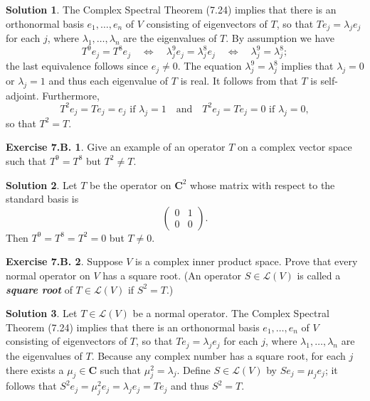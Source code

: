 \documentclass[12pt]{article}
\theoremstyle{definition}
\theoremstyle{exercise}
\newtheorem{exercise}{Exercise 7.B.}
\theoremstyle{solution}
\newtheorem*{solution}{Solution}
\newcommand{\lmap}{\mathcal{L}}
\newcommand{\quand}{\quad \text{and} \quad}
\newcommand{\quiff}{\quad \iff \quad}
\newcommand{\C}{\mathbf{C}}
\begin{document}
\begin{solution}
    The Complex Spectral Theorem (7.24) implies that there is an orthonormal basis \( e_1, \ldots, e_n \) of \( V \) consisting of eigenvectors of \( T \), so that \( T e_j = \lambda_j e_j \) for each \( j \), where \( \lambda_1, \ldots, \lambda_n \) are the eigenvalues of \( T \). By assumption we have
    \[
        T^9 e_j = T^8 e_j \quiff \lambda_j^9 e_j = \lambda_j^8 e_j \quiff \lambda_j^9 = \lambda_j^8;
    \]
    the last equivalence follows since \( e_j \neq 0 \). The equation \( \lambda_j^9 = \lambda_j^8\) implies that \( \lambda_j = 0 \) or \( \lambda_j = 1 \) and thus each eigenvalue of \( T \) is real. It follows from  that \( T \) is self-adjoint. Furthermore,
    \[
        T^2 e_j = T e_j = e_j \text{ if } \lambda_j = 1 \quand T^2 e_j = T e_j = 0 \text{ if } \lambda_j = 0,
    \]
    so that \( T^2 = T \).
\end{solution}

\begin{exercise}
\label{ex:8}
    Give an example of an operator \( T \) on a complex vector space such that \( T^9 = T^8 \) but \( T^2 \neq T \).
\end{exercise}

\begin{solution}
    Let \( T \) be the operator on \( \C^2 \) whose matrix with respect to the standard basis is
    \[
        \begin{pmatrix}
            0 & 1 \\
            0 & 0
        \end{pmatrix}.
    \]
    Then \( T^9 = T^8 = T^2 = 0 \) but \( T \neq 0 \).
\end{solution}

\begin{exercise}
\label{ex:9}
    Suppose \( V \) is a complex inner product space. Prove that every normal operator on \( V \) has a square root. (An operator \( S \in \lmap(V) \) is called a \textit{\textbf{square root}} of \( T \in \lmap(V) \) if \( S^2 = T \).)
\end{exercise}

\begin{solution}
    Let \( T \in \lmap(V) \) be a normal operator. The Complex Spectral Theorem (7.24) implies that there is an orthonormal basis \( e_1, \ldots, e_n \) of \( V \) consisting of eigenvectors of \( T \), so that \( T e_j = \lambda_j e_j \) for each \( j \), where \( \lambda_1, \ldots, \lambda_n \) are the eigenvalues of \( T \). Because any complex number has a square root, for each \( j \) there exists a \( \mu_j \in \C \) such that \( \mu_j^2 = \lambda_j \). Define \( S \in \lmap(V) \) by \( S e_j = \mu_j e_j \); it follows that \( S^2 e_j = \mu_j^2 e_j = \lambda_j e_j = T e_j \) and thus \( S^2 = T \).
\end{solution}
\end{document}
